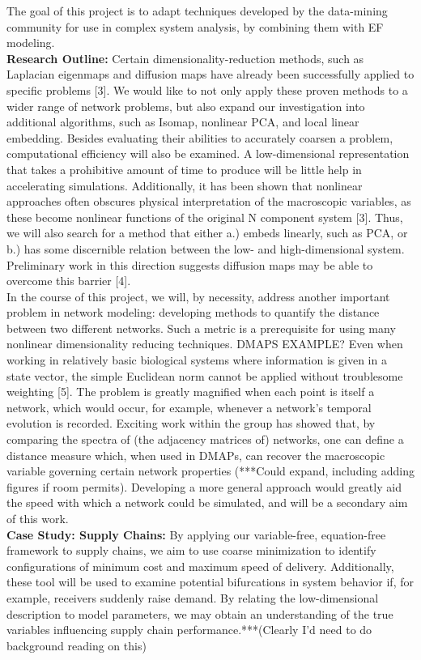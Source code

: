 \documentclass[11pt]{article}
\begin{document}
\indent The goal of this project is to adapt techniques developed by the data-mining community for use in complex system analysis, by combining them with EF modeling.\\
\textbf{Research Outline:}  Certain dimensionality-reduction methods, such as Laplacian eigenmaps and diffusion maps have already been successfully applied to specific problems [3]. We would like to not only apply these proven methods to a wider range of network problems, but also expand our investigation into additional algorithms, such as Isomap, nonlinear PCA, and local linear embedding. Besides evaluating their abilities to accurately coarsen a problem, computational efficiency will also be examined. A low-dimensional representation that takes a prohibitive amount of time to produce will be little help in accelerating simulations. Additionally, it has been shown that nonlinear approaches often obscures physical interpretation of the macroscopic variables, as these become nonlinear functions of the original N component system [3]. Thus, we will also search for a method that either a.) embeds linearly, such as PCA, or b.) has some discernible relation between the low- and high-dimensional system. Preliminary work in this direction suggests diffusion maps may be able to overcome this barrier [4].\\
\indent In the course of this project, we will, by necessity, address another important problem in network modeling: developing methods to quantify the distance between two different networks. Such a metric is a prerequisite for using many nonlinear dimensionality reducing techniques. DMAPS EXAMPLE? Even when working in relatively basic biological systems where information is given in a state vector, the simple Euclidean norm cannot be applied without troublesome weighting [5]. The problem is greatly magnified when each point is itself a network, which would occur, for example, whenever a network's temporal evolution is recorded. Exciting work within the group has showed that, by comparing the spectra of (the adjacency matrices of) networks, one can define a distance measure which, when used in DMAPs, can recover the macroscopic variable governing certain network properties (***Could expand, including adding figures if room permits). Developing a more general approach would greatly aid the speed with which a network could be simulated, and will be a secondary aim of this work.\\
\textbf{Case Study: Supply Chains:} By applying our variable-free, equation-free framework to supply chains, we aim to use coarse minimization to identify configurations of minimum cost and maximum speed of delivery. Additionally, these tool will be used to examine potential bifurcations in system behavior if, for example, receivers suddenly raise demand. By relating the low-dimensional description to model parameters, we may obtain an understanding of the true variables influencing supply chain performance.***(Clearly I'd need to do background reading on this)\\
\end{document}
